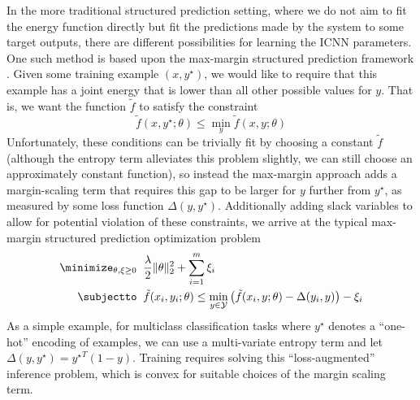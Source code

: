 In the more traditional structured prediction setting, where we do not aim to
fit the energy function directly but fit the predictions made by the system to
some target outputs, there are different possibilities for learning the ICNN
parameters.  One such method is based upon the max-margin structured
prediction framework \citep{tsochantaridis2005large,taskar2005learning}.  Given
some training example $(x, y^\star)$, we would like to require that this example
has a joint energy that is lower than all other possible values for $y$.  That
is, we want the function $\tilde{f}$ to satisfy the constraint
\begin{equation}
\tilde{f}(x, y^\star;\theta) \leq \min_y \tilde{f}(x,y;\theta)
\end{equation}
Unfortunately, these conditions can be trivially fit by choosing a constant
$\tilde{f}$ (although the entropy term alleviates this problem slightly, we can
still choose an approximately constant function), so instead the max-margin
approach adds a margin-scaling term that requires this gap to be larger for $y$
further from $y^\star$, as measured by some loss function $\Delta(y,y^\star)$.
Additionally adding slack variables to allow for potential violation of these
constraints, we arrive at the typical max-margin structured prediction
optimization problem
\begin{equation}
\begin{split}
\minimize_{\theta,\xi \geq 0} \;\; & \frac{\lambda}{2}\|\theta\|_2^2 + \sum_
{i=1}^m
\xi_i \\
\subjectto \;\; &\tilde{f}(x_i,y_i;\theta) \leq \min_{y \in \mathcal{Y}} \left
(\tilde{f}(x_i,y;\theta) - \Delta(y_i,y) \right ) - \xi_i
\end{split}
\label{eq:structured-prediction}
\end{equation}
As a simple example, for multiclass classification tasks where $y^\star$ denotes
a ``one-hot'' encoding of examples, we can use a multi-variate entropy term and
let $\Delta (y,y^\star) = {y^\star}^T (1 - y)$. Training
requires solving this ``loss-augmented'' inference problem, which is convex
for suitable choices of the margin scaling term.

